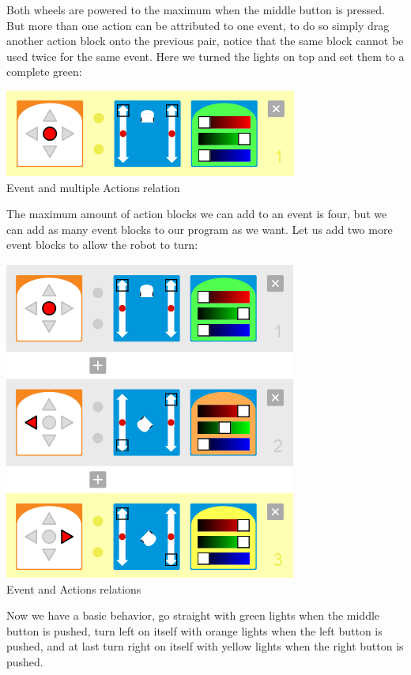 \documentclass{scrbook}
\begin{document}
Both wheels are powered to the maximum when the middle button is pressed. But more than one action can be attributed to one event, 
to do so simply drag another action block onto the previous pair, notice that the same block cannot be used twice for the same event. 
Here we turned the lights on top and set them to a complete green:\\
\begin{center}
  \includegraphics[scale=0.5]{./VPL/middlebtn_forward_green}\\
  Event and multiple Actions relation
\end{center}

The maximum amount of action blocks we can add to an event is four, but we can add as many event blocks to our program as we want. 
Let us add two more event blocks to allow the robot to turn:\\
\begin{center}
  \includegraphics[scale=0.5]{./VPL/middlebtn_3E}\\
  Event and Actions relations
\end{center}

Now we have a basic behavior, go straight with green lights when the middle button is pushed, turn left on itself with orange lights when the left button is pushed, 
and at last turn right on itself with yellow lights when the right button is pushed.\\
\end{document}
